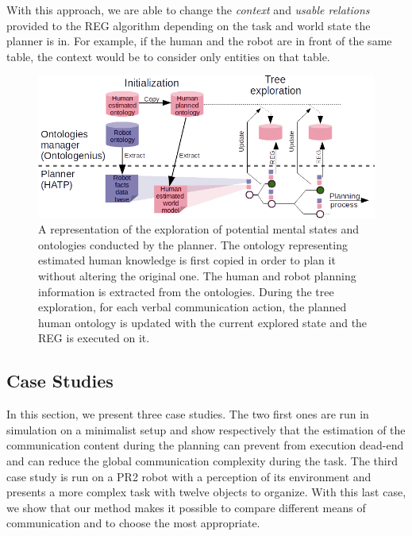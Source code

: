 \documentclass[a4paper,11pt,twoside]{StyleThese}
\begin{document}
With this approach, we are able to change the \textit{context} and \textit{usable relations} provided to the REG algorithm depending on the task and world state the planner is in. For example, if the human and the robot are in front of the same table, the context would be to consider only entities on that table.

\begin{figure}[t!]
\centering
\includegraphics[width=\textwidth]{figures/chapter3/struct.png}
\caption{\label{fig:integration} A representation of the exploration of potential mental states and ontologies conducted by the planner. The ontology representing estimated human knowledge is first copied in order to plan it without altering the original one. The human and robot planning information is extracted from the ontologies. During the tree exploration, for each verbal communication action, the planned human ontology is updated with the current explored state and the REG is executed on it.}
\end{figure}

\subsection{Case Studies}
\label{sec:Case_studies}

In this section, we present three case studies. The two first ones are run in simulation on a minimalist setup and show respectively that the estimation of the communication content during the planning can prevent from execution dead-end and can reduce the global communication complexity during the task. The third case study is run on a PR2 robot with a perception of its environment and presents a more complex task with twelve objects to organize. With this last case, we show that our method makes it possible to compare different means of communication and to choose the most appropriate.
\end{document}
